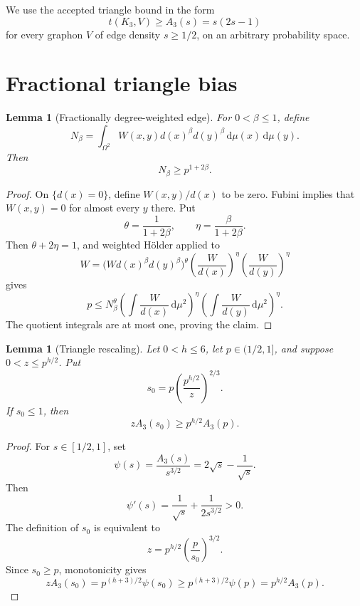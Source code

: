 \documentclass[11pt]{article}
\newtheorem{lemma}[theorem]{Lemma}
\newcommand{\dd}{\,\mathrm d}
\begin{document}
We use the accepted triangle bound in the form
\begin{equation}
 t(K_3,V)\geq A_3(s)=s(2s-1)
 \label{eq:triangle-input}
\end{equation}
for every graphon $V$ of edge density $s\geq1/2$, on an arbitrary
probability space.


\section{Fractional triangle bias}

\begin{lemma}[Fractionally degree-weighted edge]
\label{lem:fractional-edge}
For $0<\beta\leq1$, define
\[
 N_\beta=\int_{\Omega^2}W(x,y)d(x)^\beta d(y)^\beta
 \dd\mu(x)\dd\mu(y).
\]
Then
\[
 N_\beta\geq p^{1+2\beta}.
\]
\end{lemma}

\begin{proof}
On $\{d(x)=0\}$, define $W(x,y)/d(x)$ to be zero.  Fubini implies that
$W(x,y)=0$ for almost every $y$ there.  Put
\[
 \theta=\frac1{1+2\beta},
 \qquad
 \eta=\frac\beta{1+2\beta}.
\]
Then $\theta+2\eta=1$, and weighted H\"older applied to
\[
 W
 =\bigl(Wd(x)^\beta d(y)^\beta\bigr)^\theta
  \left(\frac W{d(x)}\right)^\eta
  \left(\frac W{d(y)}\right)^\eta
\]
gives
\[
 p\leq N_\beta^\theta
 \left(\int\frac W{d(x)}\dd\mu^2\right)^\eta
 \left(\int\frac W{d(y)}\dd\mu^2\right)^\eta.
\]
The quotient integrals are at most one, proving the claim.
\end{proof}

\begin{lemma}[Triangle rescaling]
\label{lem:scalar}
Let $0<h\leq6$, let $p\in(1/2,1]$, and suppose
$0<z\leq p^{h/2}$.  Put
\[
 s_0=p\left(\frac{p^{h/2}}z\right)^{2/3}.
\]
If $s_0\leq1$, then
\[
 zA_3(s_0)\geq p^{h/2}A_3(p).
\]
\end{lemma}

\begin{proof}
For $s\in[1/2,1]$, set
\[
 \psi(s)=\frac{A_3(s)}{s^{3/2}}
 =2\sqrt{s}-\frac1{\sqrt{s}}.
\]
Then
\[
 \psi'(s)=\frac1{\sqrt{s}}+\frac1{2s^{3/2}}>0.
\]
The definition of $s_0$ is equivalent to
\[
 z=p^{h/2}\left(\frac p{s_0}\right)^{3/2}.
\]
Since $s_0\geq p$, monotonicity gives
\[
 zA_3(s_0)
 =p^{(h+3)/2}\psi(s_0)
 \geq p^{(h+3)/2}\psi(p)
 =p^{h/2}A_3(p).
\]
\end{proof}
\end{document}
